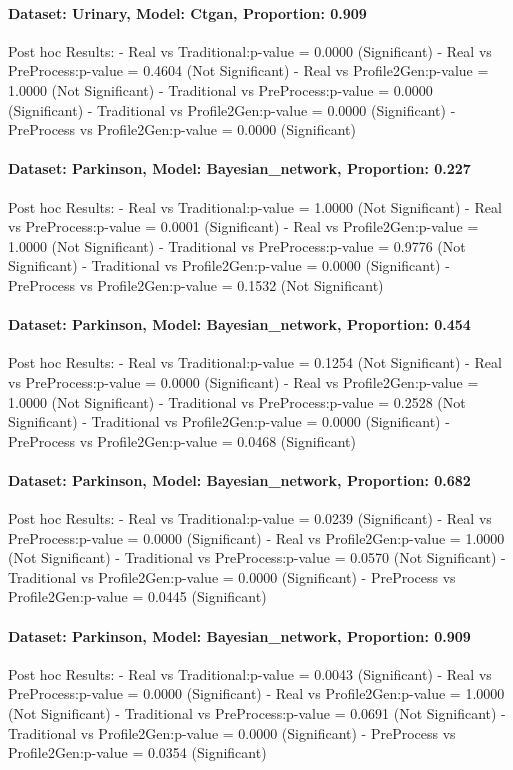 \documentclass{article}
\theoremstyle{plain}
\theoremstyle{definition}
\theoremstyle{remark}
\begin{document}
\paragraph{Dataset: Urinary, Model: Ctgan, Proportion: 0.909
}Post hoc Results:
- Real vs Traditional:p-value = 0.0000 (Significant)
- Real vs PreProcess:p-value = 0.4604 (Not Significant)
- Real vs Profile2Gen:p-value = 1.0000 (Not Significant)
- Traditional vs PreProcess:p-value = 0.0000 (Significant)
- Traditional vs Profile2Gen:p-value = 0.0000 (Significant)
- PreProcess vs Profile2Gen:p-value = 0.0000 (Significant)

\paragraph{Dataset: Parkinson, Model: Bayesian\_network, Proportion: 0.227
}Post hoc Results:
- Real vs Traditional:p-value = 1.0000 (Not Significant)
- Real vs PreProcess:p-value = 0.0001 (Significant)
- Real vs Profile2Gen:p-value = 1.0000 (Not Significant)
- Traditional vs PreProcess:p-value = 0.9776 (Not Significant)
- Traditional vs Profile2Gen:p-value = 0.0000 (Significant)
- PreProcess vs Profile2Gen:p-value = 0.1532 (Not Significant)

\paragraph{Dataset: Parkinson, Model: Bayesian\_network, Proportion: 0.454
}Post hoc Results:
- Real vs Traditional:p-value = 0.1254 (Not Significant)
- Real vs PreProcess:p-value = 0.0000 (Significant)
- Real vs Profile2Gen:p-value = 1.0000 (Not Significant)
- Traditional vs PreProcess:p-value = 0.2528 (Not Significant)
- Traditional vs Profile2Gen:p-value = 0.0000 (Significant)
- PreProcess vs Profile2Gen:p-value = 0.0468 (Significant)

\paragraph{Dataset: Parkinson, Model: Bayesian\_network, Proportion: 0.682
}Post hoc Results:
- Real vs Traditional:p-value = 0.0239 (Significant)
- Real vs PreProcess:p-value = 0.0000 (Significant)
- Real vs Profile2Gen:p-value = 1.0000 (Not Significant)
- Traditional vs PreProcess:p-value = 0.0570 (Not Significant)
- Traditional vs Profile2Gen:p-value = 0.0000 (Significant)
- PreProcess vs Profile2Gen:p-value = 0.0445 (Significant)

\paragraph{Dataset: Parkinson, Model: Bayesian\_network, Proportion: 0.909
}Post hoc Results:
- Real vs Traditional:p-value = 0.0043 (Significant)
- Real vs PreProcess:p-value = 0.0000 (Significant)
- Real vs Profile2Gen:p-value = 1.0000 (Not Significant)
- Traditional vs PreProcess:p-value = 0.0691 (Not Significant)
- Traditional vs Profile2Gen:p-value = 0.0000 (Significant)
- PreProcess vs Profile2Gen:p-value = 0.0354 (Significant)
\end{document}
